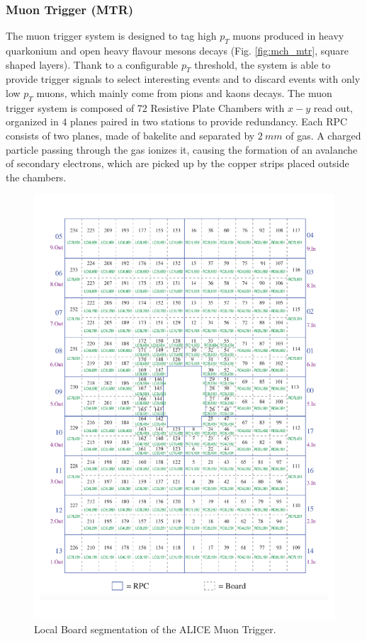 \subsubsection{Muon Trigger (MTR)}
The muon trigger system is designed to tag high $p_T$ muons produced in heavy quarkonium and open heavy flavour mesons decays (Fig. \ref{fig:mch_mtr}, square shaped layers).
Thank to a configurable $p_T$ threshold, the system is able to provide trigger signals to select interesting events and to discard events with only low $p_T$ muons, which mainly come from pions and kaons decays.
The muon trigger system is composed of 72 Resistive Plate Chambers with $x-y$ read out, organized in $4$ planes paired in two stations to provide redundancy.
Each RPC consists of two planes, made of bakelite and separated by $2\ mm$ of gas.
A charged particle passing through the gas ionizes it, causing the formation of an avalanche of secondary electrons, which are picked up by the copper strips placed outside the chambers.

\begin{figure}[!h]
\begin{center}
\includegraphics[width=0.65\linewidth]{Chapters/Introduction/Figs/LB.pdf}
\caption{Local Board segmentation of the ALICE Muon Trigger.}
\label{fig:LB}
\end{center}
\end{figure}

